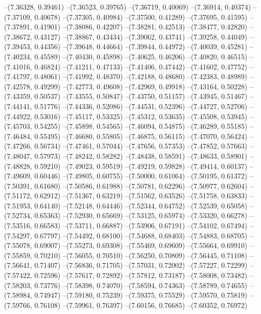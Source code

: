 --(7.36328, 0.39461)
--(7.36523, 0.39765)
--(7.36719, 0.40069)
--(7.36914, 0.40374)
--(7.37109, 0.40678)
--(7.37305, 0.40984)
--(7.37500, 0.41289)
--(7.37695, 0.41595)
--(7.37891, 0.41901)
--(7.38086, 0.42207)
--(7.38281, 0.42513)
--(7.38477, 0.42820)
--(7.38672, 0.43127)
--(7.38867, 0.43434)
--(7.39062, 0.43741)
--(7.39258, 0.44049)
--(7.39453, 0.44356)
--(7.39648, 0.44664)
--(7.39844, 0.44972)
--(7.40039, 0.45281)
--(7.40234, 0.45589)
--(7.40430, 0.45898)
--(7.40625, 0.46206)
--(7.40820, 0.46515)
--(7.41016, 0.46824)
--(7.41211, 0.47133)
--(7.41406, 0.47442)
--(7.41602, 0.47752)
--(7.41797, 0.48061)
--(7.41992, 0.48370)
--(7.42188, 0.48680)
--(7.42383, 0.48989)
--(7.42578, 0.49299)
--(7.42773, 0.49608)
--(7.42969, 0.49918)
--(7.43164, 0.50228)
--(7.43359, 0.50537)
--(7.43555, 0.50847)
--(7.43750, 0.51157)
--(7.43945, 0.51467)
--(7.44141, 0.51776)
--(7.44336, 0.52086)
--(7.44531, 0.52396)
--(7.44727, 0.52706)
--(7.44922, 0.53016)
--(7.45117, 0.53325)
--(7.45312, 0.53635)
--(7.45508, 0.53945)
--(7.45703, 0.54255)
--(7.45898, 0.54565)
--(7.46094, 0.54875)
--(7.46289, 0.55185)
--(7.46484, 0.55495)
--(7.46680, 0.55805)
--(7.46875, 0.56115)
--(7.47070, 0.56424)
--(7.47266, 0.56734)
--(7.47461, 0.57044)
--(7.47656, 0.57353)
--(7.47852, 0.57663)
--(7.48047, 0.57973)
--(7.48242, 0.58282)
--(7.48438, 0.58591)
--(7.48633, 0.58901)
--(7.48828, 0.59210)
--(7.49023, 0.59519)
--(7.49219, 0.59828)
--(7.49414, 0.60137)
--(7.49609, 0.60446)
--(7.49805, 0.60755)
--(7.50000, 0.61064)
--(7.50195, 0.61372)
--(7.50391, 0.61680)
--(7.50586, 0.61988)
--(7.50781, 0.62296)
--(7.50977, 0.62604)
--(7.51172, 0.62912)
--(7.51367, 0.63219)
--(7.51562, 0.63526)
--(7.51758, 0.63833)
--(7.51953, 0.64140)
--(7.52148, 0.64446)
--(7.52344, 0.64752)
--(7.52539, 0.65058)
--(7.52734, 0.65363)
--(7.52930, 0.65669)
--(7.53125, 0.65974)
--(7.53320, 0.66278)
--(7.53516, 0.66583)
--(7.53711, 0.66887)
--(7.53906, 0.67191)
--(7.54102, 0.67494)
--(7.54297, 0.67797)
--(7.54492, 0.68100)
--(7.54688, 0.68403)
--(7.54883, 0.68705)
--(7.55078, 0.69007)
--(7.55273, 0.69308)
--(7.55469, 0.69609)
--(7.55664, 0.69910)
--(7.55859, 0.70210)
--(7.56055, 0.70510)
--(7.56250, 0.70809)
--(7.56445, 0.71108)
--(7.56641, 0.71407)
--(7.56836, 0.71705)
--(7.57031, 0.72002)
--(7.57227, 0.72299)
--(7.57422, 0.72596)
--(7.57617, 0.72892)
--(7.57812, 0.73187)
--(7.58008, 0.73482)
--(7.58203, 0.73776)
--(7.58398, 0.74070)
--(7.58594, 0.74363)
--(7.58789, 0.74655)
--(7.58984, 0.74947)
--(7.59180, 0.75239)
--(7.59375, 0.75529)
--(7.59570, 0.75819)
--(7.59766, 0.76108)
--(7.59961, 0.76397)
--(7.60156, 0.76685)
--(7.60352, 0.76972)
